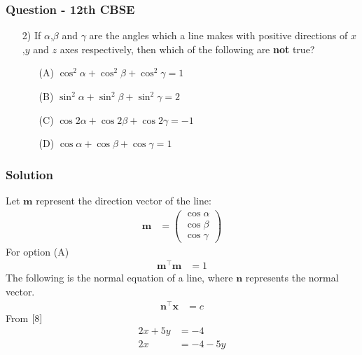 \documentclass{beamer}
\begin{document}
\begin{frame}
\frametitle{Question - 12th CBSE}
\begin{enumerate}
    \item [2)]
If $\alpha$,$\beta$ and $\gamma$ are the angles which a line makes with positive directions of $x$,$y$ and $z$ axes respectively, then which of the following are \textbf{not} true?
    \begin{enumerate}
\item [(A)] $\cos^2{\alpha} + \cos^2{\beta} + \cos^2{\gamma} = 1$
\item [(B)] $\sin^2{\alpha} + \sin^2{\beta} + \sin^2{\gamma} = 2$
\item [(C)] $\cos{2\alpha} + \cos{2\beta} + \cos{2\gamma} =-1$
\item [(D)] $\cos{\alpha} + \cos{\beta} + \cos{\gamma} = 1$
\end{enumerate}
\end{enumerate}
\end{frame}





\begin{frame}
\frametitle{Solution}
Let $\textbf{m}$ represent the direction vector of the line:
\begin{align}
    \textbf{m} &= \begin{pmatrix}
        \cos{\alpha} \\
        \cos{\beta}\\
        \cos{\gamma}
    \end{pmatrix}
\end{align}
For option (A)
\begin{align}
\textbf{m}^{\top}\textbf{m} &= 1
\end{align}
The following is the normal equation of a line, where $\textbf{n}$ represents the normal vector.
\begin{align}
    \textbf{n}^{\top}\textbf{x} &= c
\end{align}
From $\eqref{8}$
\begin{align}
    2x + 5y &= -4\\
    2x &= -4 -5y
    \end{align}
\end{frame}
\end{document}
